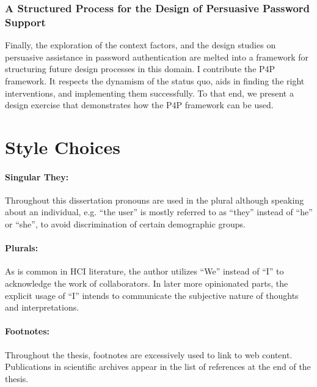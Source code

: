 \subsubsection{A Structured Process for the Design of Persuasive Password Support}
Finally, the exploration of the context factors, and the design studies on persuasive assistance in password authentication are melted into a framework for structuring future design processes in this domain. I contribute the \gls{P4P} framework. It respects the dynamism of the status quo, aids in finding the right interventions, and implementing them successfully. To that end, we present a design exercise that demonstrates how the \gls{P4P} framework can be used. 




\section{Style Choices}

\paragraph{Singular They:} Throughout this dissertation pronouns are used in the plural although speaking about an individual, e.g. ``the user'' is mostly referred to as ``they'' instead of ``he'' or ``she'', to avoid discrimination of certain demographic groups. 
\paragraph{Plurals:} As is common in HCI literature, the author utilizes ``We'' instead of ``I'' to acknowledge the work of collaborators. In later more opinionated parts, the explicit usage of ``I'' intends to communicate the subjective nature of thoughts and interpretations.
\paragraph{Footnotes:} Throughout the thesis, footnotes are excessively used to link to web content. Publications in scientific archives appear in the list of references at the end of the thesis.



